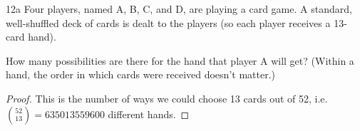 \begin{exercise}{12a}
Four players, named A, B, C, and D, are playing a card game. A standard, well-shuffled
deck of cards is dealt to the players (so each player receives a 13-card hand).

\vspace{1em}
How many possibilities are there for the hand that player A will get? (Within a
hand, the order in which cards were received doesn’t matter.)
\end{exercise}

\begin{proof}
    This is the number of ways we could choose 13 cards out of 52, i.e. ${52 \choose 13} = 635013559600$ different hands.
\end{proof}


